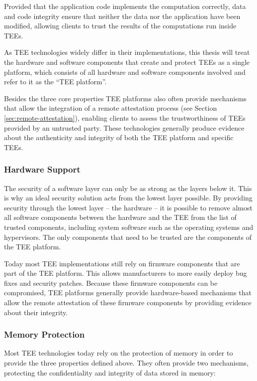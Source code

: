 Provided that the application code implements the computation correctly, data
and code integrity ensure that neither the data nor the application have been
modified, allowing clients to trust the results of the computations run inside
TEEs.

As TEE technologies widely differ in their implementations, this thesis will
treat the hardware and software components that create and protect TEEs as a
single platform, which consists of all hardware and software components involved
and refer to it as the ``TEE platform''.

Besides the three core properties TEE platforms also often provide mechanisms
that allow the integration of a remote attestation process (see Section
\ref{sec:remote-attestation}), enabling clients to assess the trustworthiness of
TEEs provided by an untrusted party. These technologies generally produce
evidence about the authenticity and integrity of both the TEE platform and
specific TEEs.

\subsubsection{Hardware Support}

The security of a software layer can only be as strong as the layers below it.
This is why an ideal security solution acts from the lowest layer possible. By
providing security through the lowest layer -- the hardware -- it is possible to
remove almost all software components between the hardware and the TEE from the
list of trusted components, including system software such as the operating
systems and hypervisors. The only components that need to be trusted are the
components of the TEE platform.

Today most TEE implementations still rely on firmware components that are part
of the TEE platform. This allows manufacturers to more easily deploy bug fixes
and security patches. Because these firmware components can be compromised, TEE
platforms generally provide hardware-based mechanisms that allow the remote
attestation of these firmware components by providing evidence about their
integrity.

\subsubsection{Memory Protection}

Most TEE technologies today rely on the protection of memory in order to provide
the three properties defined above. They often provide two mechanisms,
protecting the confidentiality and integrity of data stored in memory:

